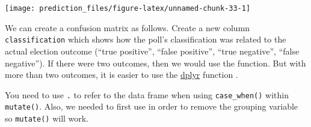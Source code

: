 \documentclass[]{book}
\newenvironment{Shaded}{\begin{snugshade}}{\end{snugshade}}
\newcommand{\KeywordTok}[1]{\textcolor[rgb]{0.13,0.29,0.53}{\textbf{#1}}}
\newcommand{\DataTypeTok}[1]{\textcolor[rgb]{0.13,0.29,0.53}{#1}}
\newcommand{\DecValTok}[1]{\textcolor[rgb]{0.00,0.00,0.81}{#1}}
\newcommand{\StringTok}[1]{\textcolor[rgb]{0.31,0.60,0.02}{#1}}
\newcommand{\OperatorTok}[1]{\textcolor[rgb]{0.81,0.36,0.00}{\textbf{#1}}}
\newcommand{\NormalTok}[1]{#1}
\theoremstyle{definition}
\theoremstyle{definition}
\theoremstyle{definition}
\theoremstyle{remark}
\begin{document}
\begin{center}\texttt{[image: prediction\_files/figure-latex/unnamed-chunk-33-1]} \end{center}

We can create a confusion matrix as follows. Create a new column
\texttt{classification} which shows how the poll's classification was
related to the actual election outcome (``true positive'', ``false
positive'', ``true negative'', ``false negative''). If there were two
outcomes, then we would use the function. But with more than two
outcomes, it is easier to use the
\href{https://cran.r-project.org/package=dplyr}{dplyr} function .

\begin{Shaded}
\end{Shaded}

You need to use \texttt{.} to refer to the data frame when using
\texttt{case\_when()} within \texttt{mutate()}. Also, we needed to first
use in order to remove the grouping variable so \texttt{mutate()} will
work.
\end{document}
